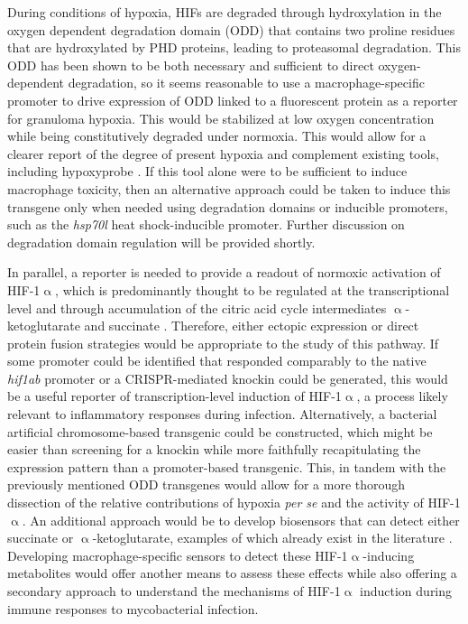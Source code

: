 During conditions of hypoxia, HIFs are degraded through hydroxylation in the oxygen dependent degradation domain (ODD) that contains two proline residues that are hydroxylated by PHD proteins, leading to proteasomal degradation. This ODD has been shown to be both necessary and sufficient to direct oxygen\hyp{}dependent degradation, so it seems reasonable to use a macrophage\hyp{}specific promoter to drive expression of ODD linked to a fluorescent protein as a reporter for granuloma hypoxia. This would be stabilized at low oxygen concentration while being constitutively degraded under normoxia. This would allow for a clearer report of the degree of present hypoxia and complement existing tools, including hypoxyprobe \citep{Cousins2016, Huang1998}. If this tool alone were to be sufficient to induce macrophage toxicity, then an alternative approach could be taken to induce this transgene only when needed using degradation domains or inducible promoters, such as the \textit{hsp70l} heat shock\hyp{}inducible promoter. Further discussion on degradation domain regulation will be provided shortly.

In parallel, a reporter is needed to provide a readout of normoxic activation of HIF\hyp{}1$\upalpha$, which is predominantly thought to be regulated at the transcriptional level and through accumulation of the citric acid cycle intermediates $\upalpha$\hyp{}ketoglutarate and succinate \citep{Meng2018, Palazon2014, Tannahill2013, Williams2018}. Therefore, either ectopic expression or direct protein fusion strategies would be appropriate to the study of this pathway. If some promoter could be identified that responded comparably to the native \textit{hif1ab} promoter or a CRISPR\hyp{}mediated knockin could be generated, this would be a useful reporter of transcription\hyp{}level induction of HIF\hyp{}1$\upalpha$, a process likely relevant to inflammatory responses during infection. Alternatively, a bacterial artificial chromosome\hyp{}based transgenic could be constructed, which might be easier than screening for a knockin while more faithfully recapitulating the expression pattern than a promoter\hyp{}based transgenic. This, in tandem with the previously mentioned ODD transgenes would allow for a more thorough dissection of the relative contributions of hypoxia \textit{per se} and the activity of HIF\hyp{}1$\upalpha$. An additional approach would be to develop biosensors that can detect either succinate or $\upalpha$\hyp{}ketoglutarate, examples of which already exist in the literature \citep{Liu2017b, Suzuki2021, Luddecke2017}. Developing macrophage\hyp{}specific sensors to detect these HIF\hyp{}1$\upalpha$\hyp{}inducing metabolites would offer another means to assess these effects while also offering a secondary approach to understand the mechanisms of HIF\hyp{}1$\upalpha$ induction during immune responses to mycobacterial infection. 

